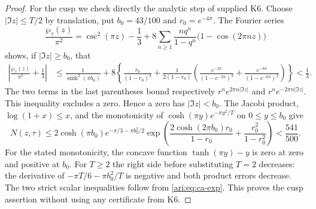 \begin{proof}
For the cusp we check directly the analytic step of supplied K6.
Choose $|\Im z|\le T/2$ by translation, put $b_0=43/100$ and
$r_0=e^{-4\pi}$. The Fourier series
\[
 \frac{\wp_\tau(z)}{\pi^2}
 =\csc^2(\pi z)-\frac13
   +8\sum_{n\ge1}\frac{nq^n}{1-q^n}
          \bigl(1-\cos(2\pi nz)\bigr)
\]
shows, if $|\Im z|\ge b_0$, that
\begin{align*}
 \left|\frac{\wp_\tau(z)}{\pi^2}+\frac13\right|
 &\le \frac1{\sinh^2(\pi b_0)}
 +8\left\{\frac{r_0}{(1-r_0)^3}
 +\frac1{2(1-r_0)}
 \left(\frac{e^{-2\pi}}{(1-e^{-2\pi})^2}
       +\frac{e^{-6\pi}}{(1-e^{-6\pi})^2}\right)\right\}
 <\frac13.
\end{align*}
The two terms in the last parentheses bound respectively
$r^n e^{2\pi n|\Im z|}$ and $r^n e^{-2\pi n|\Im z|}$.
This inequality excludes a zero. Hence a zero has
$|\Im z|<b_0$. The Jacobi product, $\log(1+x)\le x$, and
the monotonicity of $\cosh(\pi y)e^{-\pi y^2/T}$ on
$0\le y\le b_0$ give
\[
 N(z,\tau)\le
 2\cosh(\pi b_0)e^{-\pi/3-\pi b_0^2/2}
 \exp\!\left(
 \frac{2\cosh(2\pi b_0)r_0}{1-r_0}
 +\frac{r_0^2}{1-r_0^2}\right)<\frac{541}{500}.
\]
For the stated monotonicity, the concave function
$\tanh(\pi y)-y$ is zero at zero and positive at $b_0$.
For $T\ge2$ the right side before substituting $T=2$ decreases:
the derivative of $-\pi T/6-\pi b_0^2/T$ is negative and
both product errors decrease. The two strict scalar inequalities
follow from \eqref{ari:eq:ca-exp}. This proves the cusp assertion
without using any certificate from K6.
\end{proof}

